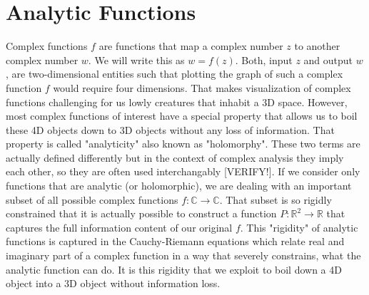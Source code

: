 \documentclass[12pt]{article}
\begin{document}
\section{Analytic Functions}
Complex functions $f$ are functions that map a complex number $z$ to another complex number $w$. We will write this as $w = f(z)$. Both, input $z$ and output $w$, are two-dimensional entities such that plotting the graph of such a complex function $f$ would require four dimensions. That makes visualization of complex functions challenging for us lowly creatures that inhabit a 3D space. However, most complex functions of interest have a special property that allows us to boil these 4D objects down to 3D objects without any loss of information. That property is called "analyticity" also known as "holomorphy". These two terms are actually defined differently but in the context of complex analysis they imply each other, so they are often used interchangably [VERIFY!]. If we consider only functions that are analytic (or holomorphic), we are dealing with an important subset of all possible complex functions $f: \mathbb{C} \rightarrow \mathbb{C}$. That subset is so rigidly constrained that it is actually possible to construct a function $P: \mathbb{R}^2 \rightarrow \mathbb{R}$ that captures the full information content of our original $f$. This "rigidity" of analytic functions is captured in the  Cauchy-Riemann equations which relate real and imaginary part of a complex function in a way that severely constrains, what the analytic function can do. It is this rigidity that we exploit to boil down a 4D object into a 3D object without information loss.
\end{document}
